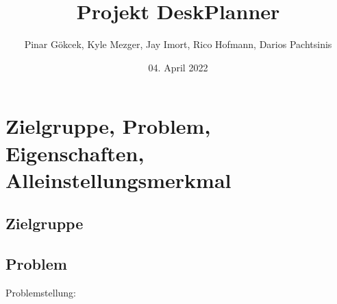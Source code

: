 \documentclass{article}
\title{Projekt DeskPlanner}
\author{Pinar Gökcek, Kyle Mezger, Jay Imort, Rico Hofmann, Darios Pachtsinis}
\date{04. April 2022}
\begin{document}
\begin{titlepage}
    \centering
    \maketitle

    \vfill

\end{titlepage}

\tableofcontents

\pagebreak

\section{Zielgruppe, Problem, Eigenschaften, Alleinstellungsmerkmal}

\subsection{Zielgruppe}

\subsection{Problem}
Problemstellung:
\end{document}
